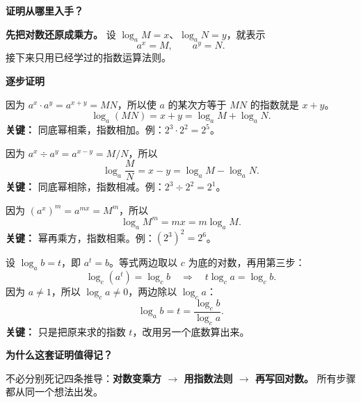 \begin{proofbox}
	\textbf{\textcolor{CProof}{证明从哪里入手？}}

	\textbf{先把对数还原成乘方。} 设 $\log_a M=x$、$\log_a N=y$，就表示
	\[
		a^x=M,\qquad a^y=N.
	\]
	接下来只用已经学过的指数运算法则。

	\medskip
	\textbf{\textcolor{CProof}{逐步证明}}
	\begin{description}[style=nextline, leftmargin=2.8em, labelsep=0.5em, itemsep=0.55em]
		\item[\textbf{第一步（积变加）：}]
			因为 $a^x\cdot a^y=a^{x+y}=MN$，所以使 $a$ 的某次方等于 $MN$ 的指数就是 $x+y$。
			\[
				\log_a(MN)=x+y=\log_a M+\log_a N.
			\]
			\textbf{关键：} 同底幂相乘，指数相加。例：$2^3\cdot2^2=2^5$。

		\item[\textbf{第二步（商变减）：}]
			因为 $a^x\div a^y=a^{x-y}=M/N$，所以
			\[
				\log_a\frac{M}{N}=x-y=\log_a M-\log_a N.
			\]
			\textbf{关键：} 同底幂相除，指数相减。例：$2^3\div2^2=2^1$。

		\item[\textbf{第三步（指数提前）：}]
			因为 $(a^x)^m=a^{mx}=M^m$，所以
			\[
				\log_a M^m=mx=m\log_a M.
			\]
			\textbf{关键：} 幂再乘方，指数相乘。例：$(2^3)^2=2^6$。

		\item[\textbf{第四步（换底）：}]
			设 $\log_a b=t$，即 $a^t=b$。等式两边取以 $c$ 为底的对数，再用第三步：
			\[
				\log_c(a^t)=\log_c b
				\quad\Longrightarrow\quad t\log_c a=\log_c b.
			\]
			因为 $a\neq1$，所以 $\log_c a\neq0$，两边除以 $\log_c a$：
			\[
				\boxed{\log_a b=t=\frac{\log_c b}{\log_c a}}.
			\]
			\textbf{关键：} 只是把原来求的指数 $t$，改用另一个底数算出来。
	\end{description}

	\medskip
	\textbf{\textcolor{CProof}{为什么这套证明值得记？}}

	不必分别死记四条推导：\textbf{对数变乘方 $\longrightarrow$ 用指数法则 $\longrightarrow$ 再写回对数。} 所有步骤都从同一个想法出发。
\end{proofbox}
